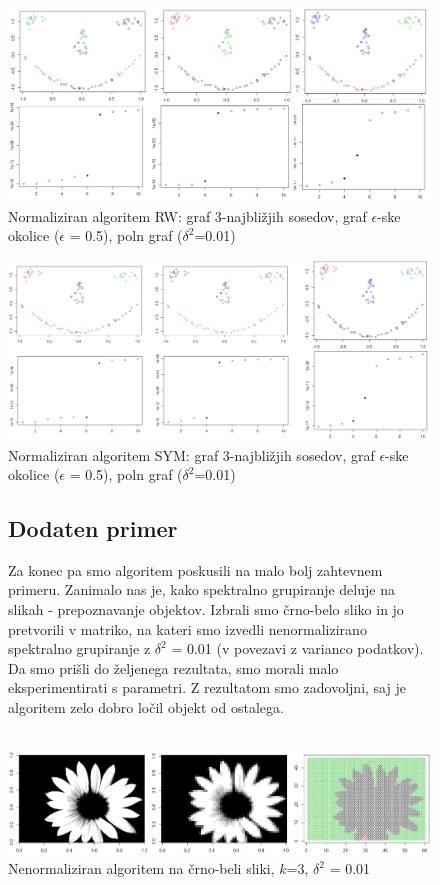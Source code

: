 \documentclass[a4paper, 10pt]{article}
\begin{document}
\begin{figure}[h]
\caption{Normaliziran algoritem RW: graf 3-najbližjih sosedov, graf $\epsilon$-ske okolice ($\epsilon$ = 0.5), poln graf ($\delta^2$=0.01)}
\includegraphics[width=\textwidth]{norm-smiley}
\end{figure}

\begin{figure}[h]
\caption{Normaliziran algoritem SYM: graf 3-najbližjih sosedov, graf $\epsilon$-ske okolice ($\epsilon$ = 0.5), poln graf ($\delta^2$=0.01)}
\includegraphics[width=\textwidth]{norm-smiley-sym}
\end{figure}

\begin{figure} [h]
\subsection{Dodaten primer}
Za konec pa smo algoritem poskusili na malo bolj zahtevnem primeru. Zanimalo nas je, kako spektralno grupiranje deluje na slikah - prepoznavanje objektov. Izbrali smo črno-belo sliko in jo pretvorili v matriko, na kateri smo izvedli nenormalizirano spektralno grupiranje z $\delta^2$ = 0.01 (v povezavi z varianco podatkov). Da smo prišli do željenega rezultata, smo morali malo eksperimentirati s parametri. Z rezultatom smo zadovoljni, saj je algoritem zelo dobro ločil objekt od ostalega.\\
\\
\caption{Nenormaliziran algoritem na črno-beli sliki, $k$=3, $\delta^2$ = 0.01}
\includegraphics[width=\textwidth]{roza}
\end{figure}
\end{document}

